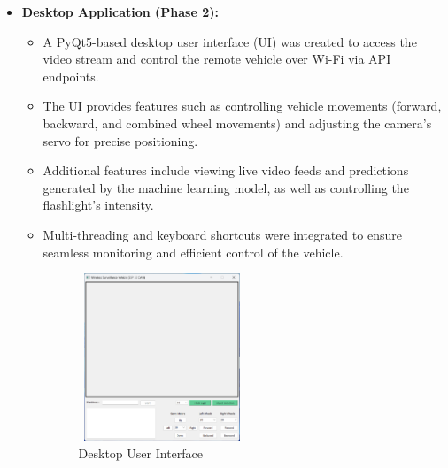 \documentclass[12pt,a4paper]{report}
\begin{document}
\begin{enumerate}
\begin{itemize}
\begin{itemize}
        
    \end{itemize}  
    \item \textbf{Desktop Application (Phase 2):}  
    \begin{itemize}  
        \item A PyQt5-based desktop user interface (UI) was created to access the video stream and control the remote vehicle over Wi-Fi via API endpoints.  
        \item The UI provides features such as controlling vehicle movements (forward, backward, and combined wheel movements) and adjusting the camera's servo for precise positioning.  
        \item Additional features include viewing live video feeds and predictions generated by the machine learning model, as well as controlling the flashlight's intensity.  
        \item Multi-threading and keyboard shortcuts were integrated to ensure seamless monitoring and efficient control of the vehicle.  
        
        
\begin{figure}[H]
    \centering
    \begin{minipage}{0.45\textwidth}
        \centering
        \includegraphics[width=5cm, height=5cm]{ui}  %
        \caption{Desktop User Interface}
        \label{fig:ui}
    \end{minipage}
\end{figure}
        
        
    \end{itemize}  
    
    
\end{itemize}



\end{enumerate}


\label{Object Detection using Machine Learning}
\end{document}

